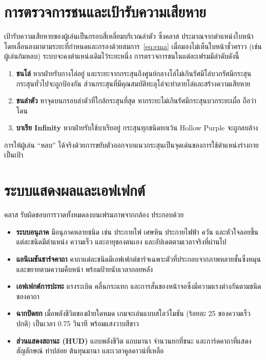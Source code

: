 \documentclass[12pt,a4paper]{report}
\newcommand{\code}[1]{\texttt{\detokenize{#1}}}
\begin{document}
\section{การตรวจการชนและเป้ารับความเสียหาย}
เป้ารับความเสียหายของผู้เล่นเป็นกรอบสี่เหลี่ยมบริเวณลำตัว ซึ่งคลาส \code{TorsoTracker} ประมาณจากตำแหน่งใบหน้า
โดยเลื่อนลงมาตามระยะที่กำหนดและกรองด้วยสมการ~\eqref{eq:ema} เมื่อมองไม่เห็นใบหน้าชั่วคราว (เช่น ผู้เล่นก้มหลบ)
ระบบจะคงตำแหน่งเดิมไว้ระยะหนึ่ง การตรวจการชนในแต่ละเฟรมมีลำดับดังนี้
\begin{enumerate}[leftmargin=2cm]
  \item \textbf{ชนโล่} หากฝ่ายรับกางโล่อยู่ และระยะจากกระสุนถึงศูนย์กลางโล่ไม่เกินรัศมีโล่บวกรัศมีกระสุน
        กระสุนทั่วไปจะถูกป้องกัน ส่วนกระสุนที่มีคุณสมบัติทะลุโล่จะทำลายโล่และสร้างความเสียหาย
  \item \textbf{ชนลำตัว} หาจุดบนกรอบลำตัวที่ใกล้กระสุนที่สุด หากระยะไม่เกินรัศมีกระสุนบวกระยะเผื่อ ถือว่าโดน
  \item \textbf{บาเรีย Infinity} หากฝ่ายรับใช้บาเรียอยู่ กระสุนทุกชนิดยกเว้น Hollow Purple จะถูกลบล้าง
\end{enumerate}
การให้ผู้เล่น ``หลบ'' ได้จริงด้วยการขยับตัวออกจากแนวกระสุนเป็นจุดเด่นของการใช้ตำแหน่งร่างกายเป็นเป้า

\section{ระบบแสดงผลและเอฟเฟกต์}
คลาส \code{UIRenderer} รับผิดชอบการวาดทั้งหมดลงบนเฟรมภาพจากกล้อง ประกอบด้วย
\begin{itemize}[leftmargin=2cm]
  \item \textbf{ระบบอนุภาค} มีอนุภาคหลายชนิด เช่น ประกายไฟ เศษหิน ประกายไฟฟ้า ควัน และหัวใจลอยขึ้น
        แต่ละชนิดมีตำแหน่ง ความเร็ว และอายุของตนเอง และอัปเดตตามเวลาจริงที่ผ่านไป
  \item \textbf{แอนิเมชันชาร์จคาถา} คาถาแต่ละชนิดมีเอฟเฟกต์ชาร์จเฉพาะตัวที่ประกอบจากภาพหลายชั้นซึ่งหมุนและขยายตามความคืบหน้า
        พร้อมป้ายนับเวลาถอยหลัง
  \item \textbf{เอฟเฟกต์การปะทะ} แรงระเบิด คลื่นกระแทก และการสั่นของหน้าจอซึ่งมีความแรงต่างกันตามชนิดของคาถา
  \item \textbf{ฉากปิดยก} เมื่อพลังชีวิตของฝ่ายใดหมด เกมจะเล่นแบบสโลว์โมชัน (ร้อยละ 25 ของความเร็วปกติ) เป็นเวลา 0.75 วินาที
        พร้อมแสงวาบสีขาว
  \item \textbf{ส่วนแสดงสถานะ (HUD)} แถบพลังชีวิต แถบมานา จำนวนยกที่ชนะ และการ์ดคาถาที่แสดงสัญลักษณ์ ท่าปล่อย ต้นทุนมานา
        และเวลาคูลดาวน์ที่เหลือ
\end{itemize}
\end{document}
